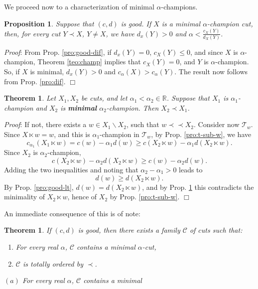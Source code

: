 \documentclass[12pt]{article}
\newenvironment{proof}{
  {\noindent\em Proof\/}:}{\hfill$\Box$\vspace{3 mm}}
\newtheorem{pro}[lem]{Proposition}
\newtheorem{teo}[lem]{Theorem}
\newcommand{\R}{\ensuremath{\mathbb{R}}\xspace}
\newcommand{\T}{\ensuremath{\mathcal{T}}\xspace}
\newcommand{\al}{\ensuremath{\alpha}\xspace}
\newcommand{\ccal}{\ensuremath{c_\alpha}\xspace}
\newcommand{\cd}{\ensuremath{(c,d)}\xspace}
\newcommand{\bip}{\prec\!\!\prec}
\newcommand{\lt}[2]{\ensuremath{#1\!\!\ltimes\!\!#2}}
\begin{document}
We proceed now to a characterization of minimal \al-champions.

\begin{pro}\label{pro:min}
  Suppose that \cd is good.  If \(X\) is a minimal \al-champion cut, then, for
  every cut \(Y\prec X\), \(Y\neq X\), we have \(d_x(Y)>0\) and
  \(\al < \frac{c_X(Y)}{d_X(Y)}\).
\end{pro}
\begin{proof}
  From Prop. \ref{pro:good-dif}, if \(d_x(Y)=0\), \(c_X(Y)\leq 0\), and since
  \(X\) is \al-champion, Theorem \ref{teo:champ} implies that \(c_X(Y) = 0\),
  and \(Y\) is \al-champion.  So, if \(X\) is minimal, \(d_x(Y)>0\) and
  \(\ccal(X)> \ccal(Y)\).  The result now follows from Prop.  \ref{pro:dif}.
\end{proof}

\begin{teo}\label{teo:chain}
  Let \(X_1,X_2\) be cuts, and let \(\al_1<\al_2\in\R\). Suppose that \(X_1\)
  is \(\al_1\)-champion and \(X_2\) is \textbf{minimal} \(\al_2\)-champion.
  Then \(X_2\prec X_1\).
\end{teo}
\begin{proof}
  If not, there exists a \(w\in X_1\backslash X_2\), such that \(w\bip X_2\).
  Consider now \(\T_w\). Since \(\lt{X}{w}= w\), and this is
  \(\al_1\)-champion in \(\T_w\), by Prop. \ref{pro:t-sub-w}, we have
  \[
    c_{\al_1}(\lt{X_1}{w}) = c(w) - \al_1d(w) \geq c(\lt{X_2}{w}) - \al_1 d(\lt{X_2}{w}).
  \]
  Since \(X_2\) is \(\al_2\)-champion,
  \[
      c(\lt{X_2}{w}) - \al_2 d(\lt{X_2}{w}) \geq c(w) - \al_2d(w).
  \]
  Adding the two inequalities and noting that \(\al_2-\al_1 > 0\) leads to
  \[
    d(w) \geq d(\lt{X_2}{w}).
  \]
  By Prop. \ref{pro:good-lt}, \(d(w) = d(\lt{X_2}{w})\), and by
  Prop. \ref{pro:min} this contradicts the minimality of \lt{X_2}{w}, hence of
  \(X_2\) by Prop. \ref{pro:t-sub-w}.
\end{proof}

An immediate consequence of this is of note:

\begin{teo}\label{teo:total}
  If \cd is good, then there exists a family \(\mathcal{C}\) of cuts such
  that:
  \begin{enumerate}
      \item For every real \(\al\), \(\mathcal{C}\) contains a minimal
  \al-cut,
      \item \(\mathcal{C}\) is totally ordered by \(\prec\).
  \end{enumerate}
  \((a)\) For every real \(\al\), \(\mathcal{C}\) contains a minimal
\end{teo}
\end{document}

